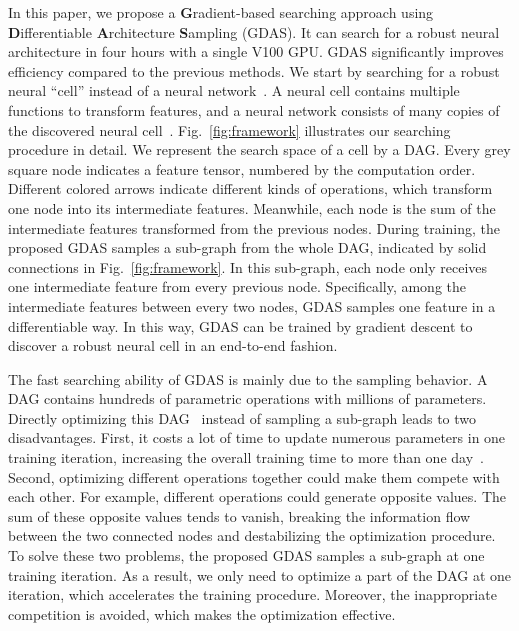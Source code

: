 \documentclass[10pt,twocolumn,letterpaper]{article}
\def\Figref#1{Fig.~\ref{#1}}
\begin{document}
In this paper, we propose a \textbf{G}radient-based searching approach using \textbf{D}ifferentiable \textbf{A}rchitecture \textbf{S}ampling (GDAS).
It can search for a robust neural architecture in four hours with a single V100 GPU.
GDAS significantly improves efficiency compared to the previous methods.
We start by searching for a robust neural ``cell'' instead of a neural network~\cite{zoph2017NAS,Zoph_2018_CVPR}.
A neural cell contains multiple functions to transform features, and a neural network consists of many copies of the discovered neural cell~\cite{Liu_2018_ECCV,Zoph_2018_CVPR}.
\Figref{fig:framework} illustrates our searching procedure in detail.
We represent the search space of a cell by a DAG.
Every grey square node indicates a feature tensor, numbered by the computation order.
Different colored arrows indicate different kinds of operations, which transform one node into its intermediate features.
Meanwhile, each node is the sum of the intermediate features transformed from the previous nodes.
During training, the proposed GDAS samples a sub-graph from the whole DAG, indicated by solid connections in \Figref{fig:framework}.
In this sub-graph, each node only receives one intermediate feature from every previous node.
Specifically, among the intermediate features between every two nodes, GDAS samples one feature in a differentiable way.
In this way, GDAS can be trained by gradient descent to discover a robust neural cell in an end-to-end fashion.




The fast searching ability of GDAS is mainly due to the sampling behavior.
A DAG contains hundreds of parametric operations with millions of parameters.
Directly optimizing this DAG~\cite{liu2019darts} instead of sampling a sub-graph leads to two disadvantages.
First, it costs a lot of time to update numerous parameters in one training iteration, increasing the overall training time to more than one day~\cite{liu2019darts}.
Second, optimizing different operations together could make them compete with each other. For example, different operations could generate opposite values.
The sum of these opposite values tends to vanish, breaking the information flow between the two connected nodes and destabilizing the optimization procedure.
To solve these two problems, the proposed GDAS samples a sub-graph at one training iteration.
As a result, we only need to optimize a part of the DAG at one iteration, which accelerates the training procedure.
Moreover, the inappropriate competition is avoided, which makes the optimization effective.
\end{document}
